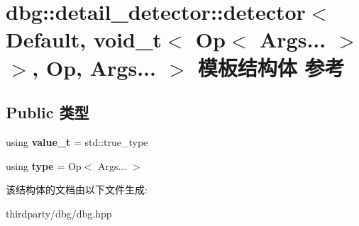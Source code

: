 \hypertarget{structdbg_1_1detail__detector_1_1detector_3_01Default_00_01void__t_3_01Op_3_01Args_8_8_8_01_4_01_4_00_01Op_00_01Args_8_8_8_01_4}{}\section{dbg\+:\+:detail\+\_\+detector\+:\+:detector$<$ Default, void\+\_\+t$<$ Op$<$ Args... $>$ $>$, Op, Args... $>$ 模板结构体 参考}
\label{structdbg_1_1detail__detector_1_1detector_3_01Default_00_01void__t_3_01Op_3_01Args_8_8_8_01_4_01_4_00_01Op_00_01Args_8_8_8_01_4}
\subsection*{Public 类型}
\begin{DoxyCompactItemize}
\item 
\mbox{\label{structdbg_1_1detail__detector_1_1detector_3_01Default_00_01void__t_3_01Op_3_01Args_8_8_8_01_4_01_4_00_01Op_00_01Args_8_8_8_01_4_ab9dc20c0565be267d2d98b0e0f4a565b}} 
using {\bfseries value\+\_\+t} = std\+::true\+\_\+type
\item 
\mbox{\label{structdbg_1_1detail__detector_1_1detector_3_01Default_00_01void__t_3_01Op_3_01Args_8_8_8_01_4_01_4_00_01Op_00_01Args_8_8_8_01_4_a2119ba35e684b8292286546a1cea10d1}} 
using {\bfseries type} = Op$<$ Args... $>$
\end{DoxyCompactItemize}


该结构体的文档由以下文件生成\+:\begin{DoxyCompactItemize}
\item 
thirdparty/dbg/dbg.\+hpp\end{DoxyCompactItemize}

